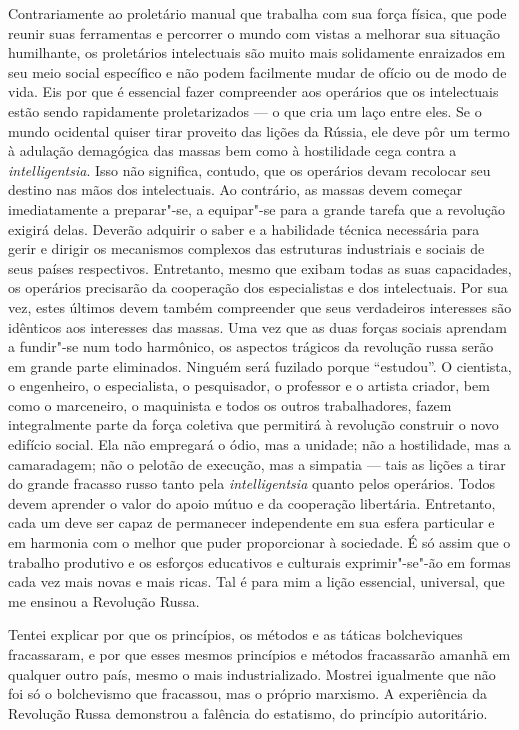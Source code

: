 Contrariamente ao proletário manual que trabalha com sua força física,
que pode reunir suas ferramentas e percorrer o mundo com vistas a
melhorar sua situação humilhante, os proletários intelectuais são muito
mais solidamente enraizados em seu meio social específico e não podem
facilmente mudar de ofício ou de modo de vida. Eis por que é essencial
fazer compreender aos operários que os intelectuais estão sendo
rapidamente proletarizados --- o que cria um laço entre eles. Se o mundo
ocidental quiser tirar proveito das lições da Rússia, ele deve pôr um
termo à adulação demagógica das massas bem como à hostilidade cega
contra a \textit{intelligentsia}. Isso não significa, contudo, que os operários
devam recolocar seu destino nas mãos dos intelectuais. Ao contrário, as
massas devem começar imediatamente a preparar"-se, a equipar"-se para
a grande tarefa que a revolução exigirá delas. Deverão adquirir o saber
e a habilidade técnica necessária para gerir e dirigir os mecanismos
complexos das estruturas industriais e sociais de seus países
respectivos. Entretanto, mesmo que exibam todas as suas capacidades, os
operários precisarão da cooperação dos especialistas e dos
intelectuais. Por sua vez, estes últimos devem também compreender que
seus verdadeiros interesses são idênticos aos interesses das massas. Uma vez
que as duas forças sociais aprendam a fundir"-se num todo harmônico,
os aspectos trágicos da revolução russa serão em grande parte
eliminados. Ninguém será fuzilado porque “estudou”. O cientista, o
engenheiro, o especialista, o pesquisador, o professor e o artista
criador, bem como o marceneiro, o maquinista e todos os outros
trabalhadores, fazem integralmente parte da força coletiva que permitirá
à revolução construir o novo edifício social. Ela não empregará o ódio,
mas a unidade; não a hostilidade, mas a camaradagem; não o pelotão de
execução, mas a simpatia --- tais as lições a tirar do grande
fracasso russo tanto pela \textit{intelligentsia} quanto pelos operários. Todos
devem aprender o valor do apoio mútuo e da cooperação libertária.
Entretanto, cada um deve ser capaz de permanecer independente em sua
esfera particular e em harmonia com o melhor que puder proporcionar à
sociedade. É só assim que o trabalho produtivo e os esforços
educativos e culturais exprimir"-se"-ão em formas cada vez mais novas
e mais ricas. Tal é para mim a lição essencial, universal, que me
ensinou a Revolução Russa.


\sectionitem
Tentei explicar por que os princípios, os métodos e as táticas
bolcheviques fracassaram, e por que esses mesmos princípios e métodos
fracassarão amanhã em qualquer outro país, mesmo o mais
industrializado. Mostrei igualmente que não foi só o bolchevismo que
fracassou, mas o próprio marxismo. A experiência da Revolução Russa
demonstrou a falência do estatismo, do princípio autoritário. 


